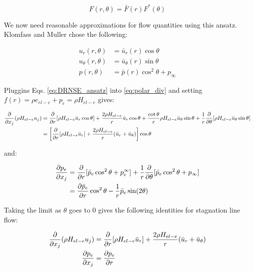 \documentclass[10pt]{article}
\begin{document}
\begin{flushleft}
\begin{equation*}
    F(r, \theta) = \bar{F}(r) F^*(\theta)
\end{equation*}

We now need reasonable approximations for flow quantities using this ansatz. Klomfass and Muller chose the following:

\begin{equation}
\begin{aligned}
    u_r (r, \theta) &= \bar{u}_r (r) \cos \theta \\
    u_\theta (r, \theta) &= \bar{u}_\theta (r) \sin \theta \\
    p(r, \theta) &= \bar{p}(r) \cos^2 \theta + p_\infty
\end{aligned}
\label{eq:DRNSE_ansatz}
\end{equation}

Pluggins Eqs. \ref{eq:DRNSE_ansatz} into \ref{eq:polar_div} and setting $f(r) = \rho e_{el-e} + p_e = \rho H_{el-e}$ gives:

\begin{align*}
    \frac{\partial }{\partial x_j} (\rho H_{el-e} u_j) &= \frac{\partial }{\partial r} [\rho H_{el-e} \bar{u}_r \cos \theta] + \frac{2 \rho H_{el-e}}{r} \bar{u}_r \cos \theta + \frac{\cot \theta}{r} \rho H_{el-e} \bar{u}_\theta \sin \theta + \frac{1}{r} \frac{\partial }{\partial \theta} [\rho H_{el-e} \bar{u}_\theta \sin \theta] \\
    &= \left[  \frac{\partial }{\partial r}[\rho H_{el-e} \bar{u}_r] + \frac{2 \rho H_{el-e}}{r} (\bar{u}_r + \bar{u}_\theta) \right] \cos \theta \\
\end{align*}

and:

\begin{align*}
    \frac{\partial p_e}{\partial x_j} &= \frac{\partial }{\partial r} [\bar{p}_e \cos^2 \theta + p_e^\infty] + \frac{1}{r} \frac{\partial }{\partial \theta} [\bar{p}_e \cos^2 \theta + p_\infty] \\
    &= \frac{\partial \bar{p}_e}{\partial r} \cos^2 \theta - \frac{1}{r} \bar{p}_e \sin(2 \theta)
\end{align*}

Taking the limit as $\theta$ goes to 0 gives the following identities for stagnation line flow:

\begin{align*}
    \frac{\partial }{\partial x_j} (\rho H_{el-e} u_j) &= \frac{\partial }{\partial r}[\rho H_{el-e} \bar{u}_r] + \frac{2 \rho H_{el-e}}{r} (\bar{u}_r + \bar{u}_\theta) \\
    \frac{\partial p_e}{\partial x_j} &= \frac{\partial p_e}{\partial r}
\end{align*}


\end{flushleft}
\end{document}
